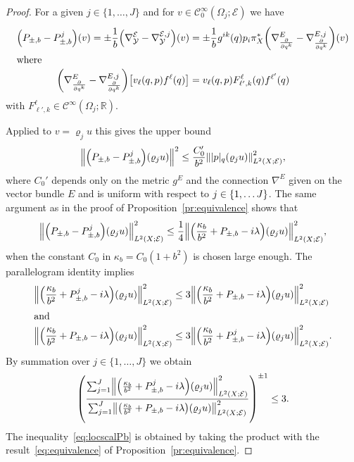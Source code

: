 \documentclass[10pt]{amsart}
\theoremstyle{definition}\newtheorem{defi}[theo]{Definition}\newtheorem{rema}[theo]{Remark}\newtheorem{exam}[theo]{Example}\newtheorem{exem}[theo]{Example}\newtheorem{nota}[theo]{Notation}
\newcommand{\R}{\mathbb{R}}
\newcommand{\clC}{\mathcal{C}}
\newcommand{\clY}{\mathcal{Y}}
\newcommand{\clE}{\mathcal{E}}
\let\originalleft\left
\let\originalright\right
\renewcommand{\left}{\mathopen{}\mathclose\bgroup\originalleft}
\renewcommand{\right}{\aftergroup\egroup\originalright}
\begin{document}
\begin{proof}
For a given $j\in \{1,\dots, J\}$ and for $v\in \clC^{\infty}_{0}(\Omega_{j};\clE)$ we have
\begin{align}
\left(P_{\pm,b} - P_{\pm,b}^j\right) (v) = \pm\frac{1}{b}\left(\nabla_{\clY}^{\clE}-\nabla^{\clE,j}_{\clY}\right)(v)
&=\pm\frac{1}{b} g^{ik}(q)p_{i}\pi_{X}^{*}\left(\nabla^{E}_{\frac{\partial}{\partial q^{k}}}-\nabla^{E,j}_{\frac{\partial}{\partial q^{k}}}\right)(v)
\\
\intertext{where}
\left(\nabla^{E}_{\frac{\partial}{\partial q^{k}}}-\nabla^{E,j}_{\frac{\partial}{\partial q^{k}}}\right)\left[v_{\ell}(q,p)f^{\ell}(q)\right]&=v_{\ell}(q,p)F^{\ell}_{\ell',k}(q)f^{\ell'}(q)
\end{align}
with $F^{\ell}_{\ell',k}\in \clC^{\infty}(\Omega_{j};\R)$.

Applied to $v=\varrho_{j}u$ this gives the upper bound
\[
\left\|\left(P_{\pm,b} - P_{\pm, b}^j\right)(\varrho_j u) \right\|^2 \leq \frac{C_0'}{b^2} \left\| |p|_q (\varrho_j u)\right\|_{L^{2}(X;\clE)}^2,
\]
where $C_0'$ depends only on the metric $g^E$ and the connection $\nabla^E$ given on the vector bundle $E$ and is uniform with respect to $j\in \left\{1,\dots J\right\}$. The same argument as in the proof of Proposition~\ref{pr:equivalence} shows that
\[
\left\| \left(P_{\pm,b} - P_{\pm,b}^j\right) (\varrho_j u) \right\|^2_{L^2(X;\clE)} \leq \frac{1}{4} \left\|\left(\frac{\kappa_b}{b^2}+ P_{\pm,b} -i \lambda\right) (\varrho_j u)\right\|^2_{L^2(X;\clE)},
\]
when the constant $C_{0}$ in $\kappa_{b}=C_{0}(1+b^{2})$ is chosen large enough. The parallelogram identity implies
\begin{align*}
\left\|\left(\frac{\kappa_b}{b^2}+ P_{\pm,b}^{j} -i \lambda\right) (\varrho_j u) \right\|^2_{L^2(X;\clE)} &\leq 3
\left\|\left(\frac{\kappa_b}{b^2}+ P_{\pm,b} -i \lambda\right) (\varrho_j u)\right\|^2_{L^2(X;\clE)}
\\
\intertext{and}
\left\|\left(\frac{\kappa_b}{b^2}+ P_{\pm,b} -i \lambda\right) (\varrho_j u)\right\|^2_{L^2(X;\clE)} &\leq 3
\left\|\left(\frac{\kappa_b}{b^2}+ P_{\pm,b}^{j} -i \lambda\right) (\varrho_j u)\right\|^2_{L^2(X;\clE)}.
\end{align*}
By summation over $j\in \{1,\dots,J\}$ we obtain
\[
\left(\frac{\sum_{j=1}^{J}\left\| \left(\frac{\kappa_b}{b^2}+ P_{\pm,b}^{j} -i \lambda\right) (\varrho_j u) \right\|^2_{L^2(X;\clE)}}{\sum_{j=1}^{J}\left\|\left(\frac{\kappa_b}{b^2}+ P_{\pm,b} -i \lambda\right) (\varrho_j u) \right\|^2_{L^2(X;\clE)}}\right)^{\pm 1}\leq 3.
\]
The inequality~\eqref{eq:locscalPb} is obtained by taking the product with the result~\eqref{eq:equivalence} of Proposition~\ref{pr:equivalence}.
\end{proof}
\end{document}
